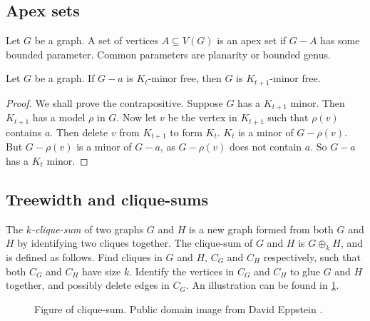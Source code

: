 \subsection{Apex sets}\label{sssec:Apex_Vertices}
Let $G$ be a graph. A set of vertices $A \subseteq V(G)$ is an apex set if $G - A$ has some bounded parameter. Common parameters are planarity or bounded genus. 
\begin{proposition}
	Let $G$ be a graph. If \(G-a\) is \(K_{t}\)-minor free, then $G$ is $K_{t+1}$-minor free. 
\end{proposition}
\begin{proof}
	We shall prove the contrapositive. Suppose \(G\) has a \(K_{t + 1}\) minor. Then \(K_{t + 1}\) has a model $\rho$ in \(G\). Now let \(v\) be the vertex in \(K_{t + 1}\) such that \(\rho(v)\) contains \(a\). Then delete \(v\) from \(K_{t + 1}\) to form $K_t$. \(K_t\) is a minor of \(G - \rho(v)\). But \(G - \rho(v)\) is a minor of \(G - a\), as \(G - \rho(v)\) does not contain \(a\). So \(G - a\) has a \(K_t\) minor. 
\end{proof}
\subsection{Treewidth and clique-sums}\label{sssec:Clique_Sums}
The \textit{\(k\)-clique-sum} of two graphs \(G\) and \(H\) is a new graph formed from both $G$ and $H$ by identifying two cliques together. The clique-sum of $G$ and $H$ is \(G \oplus_k H\), and is defined as follows. Find cliques in \(G\) and \(H\), \(C_G\) and \(C_H\) respectively, such that both \(C_G\) and \(C_H\) have size \(k\). Identify the vertices in \(C_G\) and \(C_H\) to glue \(G\) and \(H\) together, and possibly delete edges in $C_G$. An illustration can be found in \cref{fig:clique-sum}. 

\begin{figure}[h]
	\centering
	
	\caption[Clique-sum]{Figure of clique-sum. Public domain image from David Eppstein \cite{eppsteinCliquesum2023}.}
	\label{fig:clique-sum}
\end{figure}


